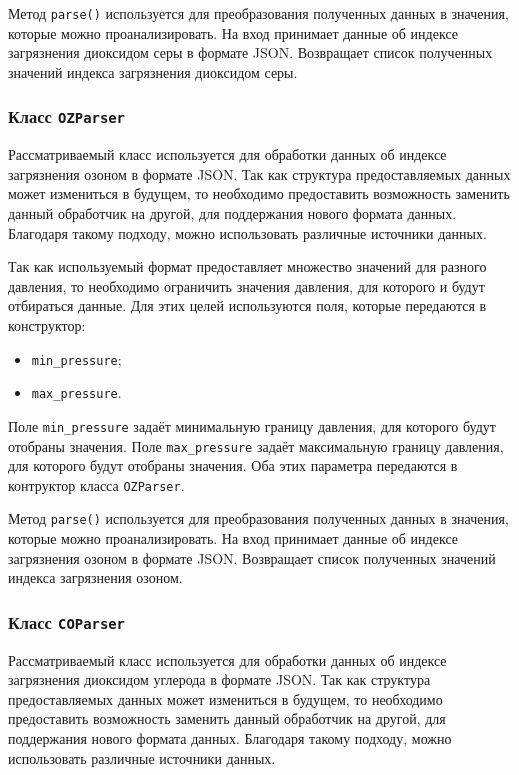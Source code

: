 Метод \texttt{parse()} используется для преобразования полученных данных в значения, которые можно проанализировать.
На вход принимает данные об индексе загрязнения диоксидом серы в формате JSON.
Возвращает список полученных значений индекса загрязнения диоксидом серы.


\subsubsection{Класс \texttt{OZParser}}
Рассматриваемый класс используется для обработки данных об индексе загрязнения озоном в формате JSON.
Так как структура предоставляемых данных может измениться в будущем, то необходимо предоставить возможность заменить данный обработчик на другой, для поддержания нового формата данных.
Благодаря такому подходу, можно использовать различные источники данных.

Так как используемый формат предоставляет множество значений для разного давления, то необходимо ограничить значения давления, для которого и будут отбираться данные.
Для этих целей используются поля, которые передаются в конструктор:
\begin{itemize}
    \item \texttt{min\_pressure};
    \item \texttt{max\_pressure}.
\end{itemize}

Поле \texttt{min\_pressure} задаёт минимальную границу давления, для которого будут отобраны значения.
Поле \texttt{max\_pressure} задаёт максимальную границу давления, для которого будут отобраны значения.
Оба этих параметра передаются в контруктор класса \texttt{OZParser}.

Метод \texttt{parse()} используется для преобразования полученных данных в значения, которые можно проанализировать.
На вход принимает данные об индексе загрязнения озоном в формате JSON.
Возвращает список полученных значений индекса загрязнения озоном.


\subsubsection{Класс \texttt{COParser}}
Рассматриваемый класс используется для обработки данных об индексе загрязнения диоксидом углерода в формате JSON.
Так как структура предоставляемых данных может измениться в будущем, то необходимо предоставить возможность заменить данный обработчик на другой, для поддержания нового формата данных.
Благодаря такому подходу, можно использовать различные источники данных.

